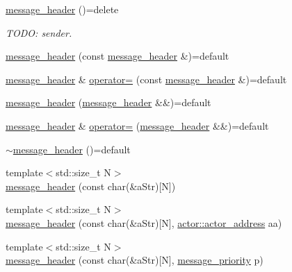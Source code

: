 \begin{DoxyCompactItemize}
\item 
\hyperlink{classactor__zeta_1_1messaging_1_1message__header_abf2d47dad0447a85a98af5278b8c41d7}{message\+\_\+header} ()=delete
\begin{DoxyCompactList}\small\item\em T\+O\+DO\+: sender. \end{DoxyCompactList}\item 
\hyperlink{classactor__zeta_1_1messaging_1_1message__header_ab9e1df4b6e34017290072131176bf336}{message\+\_\+header} (const \hyperlink{classactor__zeta_1_1messaging_1_1message__header}{message\+\_\+header} \&)=default
\item 
\hyperlink{classactor__zeta_1_1messaging_1_1message__header}{message\+\_\+header} \& \hyperlink{classactor__zeta_1_1messaging_1_1message__header_a76e0e6a25003ff83834db37c11ad728b}{operator=} (const \hyperlink{classactor__zeta_1_1messaging_1_1message__header}{message\+\_\+header} \&)=default
\item 
\hyperlink{classactor__zeta_1_1messaging_1_1message__header_ad67f634d2415e3f335910938ac841a3e}{message\+\_\+header} (\hyperlink{classactor__zeta_1_1messaging_1_1message__header}{message\+\_\+header} \&\&)=default
\item 
\hyperlink{classactor__zeta_1_1messaging_1_1message__header}{message\+\_\+header} \& \hyperlink{classactor__zeta_1_1messaging_1_1message__header_a4c2858dc53435dee1cf4da34e853b675}{operator=} (\hyperlink{classactor__zeta_1_1messaging_1_1message__header}{message\+\_\+header} \&\&)=default
\item 
\hyperlink{classactor__zeta_1_1messaging_1_1message__header_ae7991a9cfd43408a5a53fe9c759f3a4a}{$\sim$message\+\_\+header} ()=default
\item 
{\footnotesize template$<$std\+::size\+\_\+t N$>$ }\\\hyperlink{classactor__zeta_1_1messaging_1_1message__header_ac650738a01c794ec64b6919ed4a74d1d}{message\+\_\+header} (const char(\&a\+Str)\mbox{[}N\mbox{]})
\item 
{\footnotesize template$<$std\+::size\+\_\+t N$>$ }\\\hyperlink{classactor__zeta_1_1messaging_1_1message__header_a47449224c5e577ff4ac9c2e664b86b5b}{message\+\_\+header} (const char(\&a\+Str)\mbox{[}N\mbox{]}, \hyperlink{classactor__zeta_1_1actor_1_1actor__address}{actor\+::actor\+\_\+address} aa)
\item 
{\footnotesize template$<$std\+::size\+\_\+t N$>$ }\\\hyperlink{classactor__zeta_1_1messaging_1_1message__header_a678cb12ace7bb6f4d223c2c8c86c1529}{message\+\_\+header} (const char(\&a\+Str)\mbox{[}N\mbox{]}, \hyperlink{namespaceactor__zeta_1_1messaging_a1b4c4b3ab625eb033c15da4fbe9c4a89}{message\+\_\+priority} p)

\end{DoxyCompactItemize}
